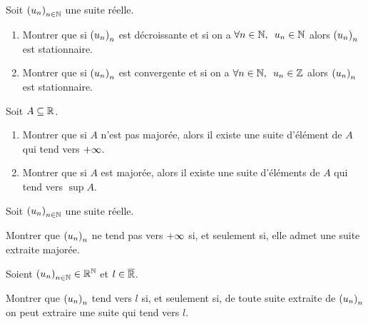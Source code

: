 \begin{exo}[Exercice 7]
Soit \(\left(u_n\right)_{n\in\mathbb{N}}\) une suite réelle.

\begin{enumerate}
\item Montrer que si \(\left(u_n\right)_n\) est décroissante et si on a \(\quantifs{\forall n\in\N}u_n\in\N\) alors \(\left(u_n\right)_n\) est stationnaire. \\

\item Montrer que si \(\left(u_n\right)_n\) est convergente et si on a \(\quantifs{\forall n\in\N}u_n\in\Z\) alors \(\left(u_n\right)_n\) est stationnaire.
\end{enumerate}
\end{exo}

\begin{corr}
\end{corr}

\begin{exo}[Exercice 8]
Soit \(A\subseteq\mathbb{R}\).

\begin{enumerate}
\item Montrer que si \(A\) n'est pas majorée, alors il existe une suite d'élément de \(A\) qui tend vers \(+\infty\). \\

\item Montrer que si \(A\) est majorée, alors il existe une suite d'éléments de \(A\) qui tend vers \(\sup A\).
\end{enumerate}
\end{exo}

\begin{corr}
\end{corr}

\begin{exo}[Exercice 9]
Soit \(\left(u_n\right)_{n\in\mathbb{N}}\) une suite réelle.

Montrer que \(\left(u_n\right)_n\) ne tend pas vers \(+\infty\) si, et seulement si, elle admet une suite extraite majorée.
\end{exo}

\begin{corr}
\end{corr}

\begin{exo}[Exercice 10]
Soient \(\left(u_n\right)_{n\in\mathbb{N}}\in\mathbb{R}^{\mathbb{N}}\) et \(l\in\overline{\mathbb{R}}\).

Montrer que \(\left(u_n\right)_n\) tend vers \(l\) si, et seulement si, de toute suite extraite de \(\left(u_n\right)_n\) on peut extraire une suite qui tend vers \(l\).
\end{exo}

